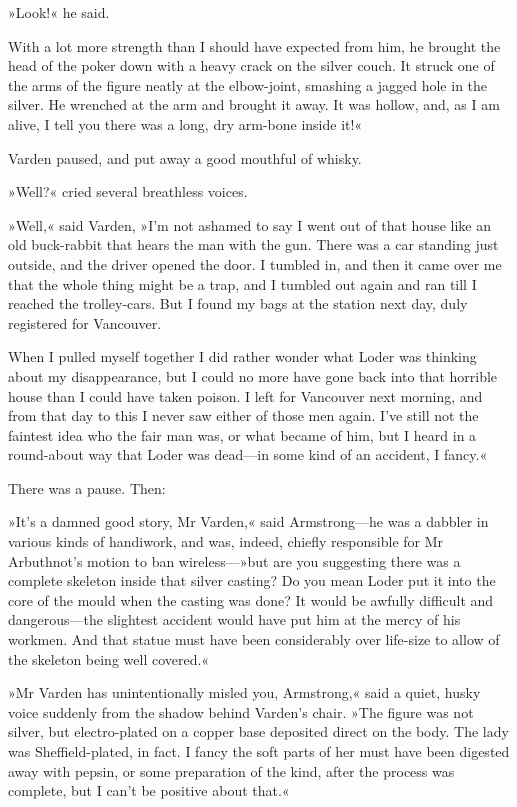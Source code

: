 »Look!« he said.

With a lot more strength than I should have expected from him, he brought the head of the poker down with a heavy crack on the silver couch. It struck one of the arms of the figure neatly at the elbow-joint, smashing a jagged hole in the silver. He wrenched at the arm and brought it away. It was hollow, and, as I am alive, I tell you there was a long, dry arm-bone inside it!«

Varden paused, and put away a good mouthful of whisky.

»Well?« cried several breathless voices.

»Well,« said Varden, »I'm not ashamed to say I went out of that house like an old buck-rabbit that hears the man with the gun. There was a car standing just outside, and the driver opened the door. I tumbled in, and then it came over me that the whole thing might be a trap, and I tumbled out again and ran till I reached the trolley-cars. But I found my bags at the station next day, duly registered for Vancouver.

When I pulled myself together I did rather wonder what Loder was thinking about my disappearance, but I could no more have gone back into that horrible house than I could have taken poison. I left for Vancouver next morning, and from that day to this I never saw either of those men again. I've still not the faintest idea who the fair man was, or what became of him, but I heard in a round-about way that Loder was dead—in some kind of an accident, I fancy.«

There was a pause. Then:

»It's a damned good story, Mr Varden,« said Armstrong—he was a dabbler in various kinds of handiwork, and was, indeed, chiefly responsible for Mr Arbuthnot's motion to ban wireless—»but are you suggesting there was a complete skeleton inside that silver casting? Do you mean Loder put it into the core of the mould when the casting was done? It would be awfully difficult and dangerous—the slightest accident would have put him at the mercy of his workmen. And that statue must have been considerably over life-size to allow of the skeleton being well covered.«

»Mr Varden has unintentionally misled you, Armstrong,« said a quiet, husky voice suddenly from the shadow behind Varden's chair. »The figure was not silver, but electro-plated on a copper base deposited direct on the body. The lady was Sheffield-plated, in fact. I fancy the soft parts of her must have been digested away with pepsin, or some preparation of the kind, after the process was complete, but I can't be positive about that.«

